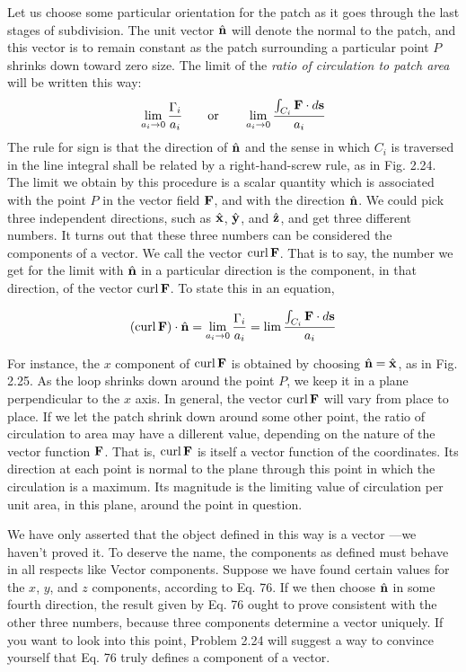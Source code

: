 Let us choose some particular orientation for the patch as it goes
through the last stages of subdivision. The unit vector $\hat{\mathbf{n}}$ will denote
the normal to the patch, and this vector is to remain constant as the
patch surrounding a particular point $P$ shrinks down toward zero
size. The limit of the \emph{ratio of circulation to patch area} will be written
this way:
\begin{equation}
  \lim_{a_i\rightarrow0} \frac{\Gamma_i}{a_i}
  \qquad \text{or} \qquad
  \lim_{a_i\rightarrow0} \frac{\int_{C_i} \mathbf{F}\cdot d\mathbf{s}}{a_i}
\end{equation}
The rule for sign is that the direction of $\hat{\mathbf{n}}$ and the sense in which $C_i$
is traversed in the line integral shall be related by a right-hand-screw
rule, as in Fig. 2.24. The limit we obtain by this procedure is a scalar
quantity which is associated with the point $P$ in the vector field $\mathbf{F}$,
and with the direction $\hat{\mathbf{n}}$. We could pick three independent directions,
such as $\hat{\mathbf{x}}$, $\hat{\mathbf{y}}$, and $\hat{\mathbf{z}}$, and get three different numbers. It turns
out that these three numbers can be considered the components of a
vector. We call the vector $\operatorname{curl}\mathbf{F}$. That is to say, the number we get
for the limit with $\hat{\mathbf{n}}$ in a particular direction is the component, in that
direction, of the vector $\operatorname{curl}\mathbf{F}$. To state this in an equation,
\begin{framed}
\begin{equation}
  (\operatorname{curl}\mathbf{F})\cdot\hat{\mathbf{n}} = \lim_{a_i\rightarrow0} \frac{\Gamma_i}{a_i}
         = \lim \frac{\int_{C_i} \mathbf{F}\cdot d\mathbf{s}}{a_i}
\end{equation}
\end{framed}

For instance, the $x$ component of $\operatorname{curl}\mathbf{F}$ is obtained by choosing
$\hat{\mathbf{n}}=\hat{\mathbf{x}}$, as in Fig. 2.25. As the loop shrinks down around the point $P$,
we keep it in a plane perpendicular to the $x$ axis. In general, the
vector $\operatorname{curl}\mathbf{F}$ will vary from place to place. If we let the patch shrink
down around some other point, the ratio of circulation to area may
have a dillerent value, depending on the nature of the vector function
$\mathbf{F}$. That is, $\operatorname{curl}\mathbf{F}$ is itself a vector function of the coordinates.
Its direction at each point is normal to the plane through this point
in which the circulation is a maximum. Its magnitude is the limiting
value of circulation per unit area, in this plane, around the point in
question.

We have only asserted that the object defined in this way is a vector
---we haven't proved it. To deserve the name, the components as
defined must behave in all respects like Vector components. Suppose
we have found certain values for the $x$, $y$, and $z$ components, according
to Eq. 76. If we then choose $\hat{\mathbf{n}}$ in some fourth direction, the result
given by Eq. 76 ought to prove consistent with the other three numbers,
because three components determine a vector uniquely. If you
want to look into this point, Problem 2.24 will suggest a way to convince
yourself that Eq. 76 truly defines a component of a vector.

